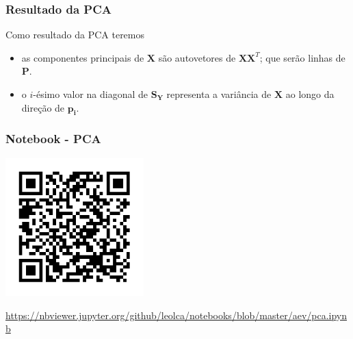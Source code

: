 \begin{frame}[allowframebreaks]
  \frametitle{Resultado da PCA}
  Como resultado da PCA teremos
  \begin{itemize}
  \item as componentes principais de $\mathbf{X}$ são autovetores de $\mathbf{X}\mathbf{X}^T$; que serão linhas de $\mathbf{P}$.
  \item o $i$-ésimo valor na diagonal de $\mathbf{S_Y}$ representa a variância de $\mathbf{X}$ ao longo da direção de $\mathbf{p_i}$.
  \end{itemize}
\end{frame}

\begin{frame}%
  \frametitle{Notebook - PCA}
  \centering
  \includegraphics[width=0.4\textwidth]{images/qrcode-jupyter-pca.pdf}

  \url{https://nbviewer.jupyter.org/github/leolca/notebooks/blob/master/aev/pca.ipynb}
\end{frame} 
